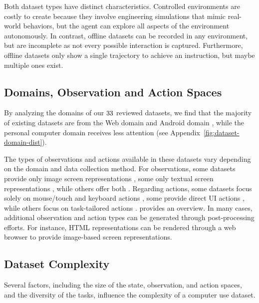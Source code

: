 Both dataset types have distinct characteristics. 
Controlled environments are costly to create because they involve engineering simulations that mimic real-world behaviors, but the agent can explore all aspects of the environment autonomously.
In contrast, offline datasets can be recorded in any environment, but are incomplete as not every possible interaction is captured.
Furthermore, offline datasets only show a single trajectory to achieve an instruction, but maybe multiple ones exist.


\subsection{Domains, Observation and Action Spaces}
By analyzing the domains of our $33$ reviewed datasets, we find that the majority of existing datasets are from the Web domain  and Android domain , while the personal computer domain  receives less attention (see Appendix~\cref{fig:dataset-domain-dist}).

The types of observations and actions available in these datasets vary depending on the domain and data collection method. For observations, some datasets provide only image screen representations , some only textual screen representations , while others offer both . Regarding actions, some datasets focus solely on mouse/touch and keyboard actions , some provide direct UI actions , while others focus on task-tailored actions .
 provides an overview.
% 
In many cases, additional observation and action types can be generated through post-processing efforts. For instance, HTML representations can be rendered through a web browser to provide image-based screen representations.

\subsection{Dataset Complexity}
Several factors, including the size of the state, observation, and action spaces, and the diversity of the tasks, influence the complexity of a computer use dataset. 

